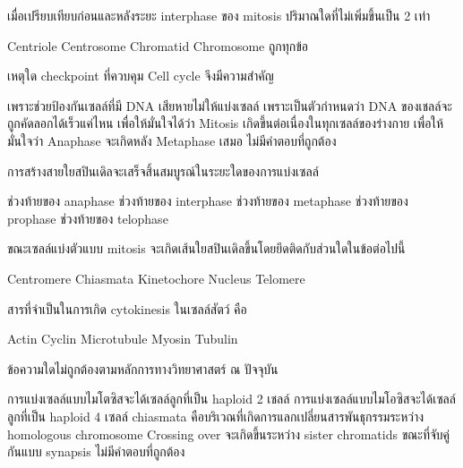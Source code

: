 \begin{questions}
\filbreak
  \question เมื่อเปรียบเทียบก่อนและหลังระยะ interphase ของ mitosis ปริมาณใดที่ไม่เพิ่มขึ้นเป็น 2 เท่า
  \begin{choices}
    \choice Centriole
    \choice Centrosome
    \choice Chromatid
    \choice Chromosome
    \choice ถูกทุกข้อ
\end{choices}

\filbreak
  \question เหตุใด checkpoint ที่ควบคุม Cell cycle จึงมีความสำคัญ
  \begin{choices}
    \choice เพราะช่วยป้องกันเซลล์ที่มี DNA เสียหายไม่ให้แบ่งเซลล์
    \choice เพราะเป็นตัวกำหนดว่า DNA ของเชลล์จะถูกคัดลอกได้เร็วแค่ไหน
    \choice เพื่อให้มั่นใจได้ว่า Mitosis เกิดขึ้นต่อเนื่องในทุกเซลล์ของร่างกาย
    \choice เพื่อให้มั่นใจว่า Anaphase จะเกิดหลัง Metaphase เสมอ
    \choice ไม่มีคำตอบที่ถูกต้อง
\end{choices}

\filbreak
  \question การสร้างสายใยสปินเดิลจะเสร็จสิ้นสมบูรณ์ในระยะใดของการแบ่งเซลล์
  \begin{choices}
    \choice ช่วงท้ายของ anaphase
    \choice ช่วงท้ายของ interphase
    \choice ช่วงท้ายของ metaphase
    \choice ช่วงท้ายของ prophase
    \choice ช่วงท้ายของ telophase
\end{choices}

\filbreak
  \question ขณะเซลล์แบ่งตัวแบบ mitosis จะเกิดเส้นใยสปินเดิลขึ้นโดยยึดติดกับส่วนใดในข้อต่อไปนี้
  \begin{choices}
    \choice Centromere
    \choice Chiasmata
    \choice Kinetochore
    \choice Nucleus
    \choice Telomere
\end{choices}

\filbreak
  \question สารที่จำเป็นในการเกิด cytokinesis ในเซลล์สัตว์ คือ
  \begin{choices}
    \choice Actin
    \choice Cyclin
    \choice Microtubule
    \choice Myosin
    \choice Tubulin
\end{choices}

\filbreak
  \question ข้อความใดไม่ถูกต้องตามหลักการทางวิทยาศาสตร์ ณ ปัจจุบัน
  \begin{choices}
    \choice การแบ่งเซลล์แบบไมโตซิสจะได้เซลล์ลูกที่เป็น haploid 2 เชลล์
    \choice การแบ่งเซลล์แบบไมโอซิสจะได้เซลล์ลูกที่เป็น haploid 4 เซลล์
    \choice chiasmata คือบริเวณที่เกิดการแลกเปลี่ยนสารพันธุกรรมระหว่าง homologous chromosome
    \choice Crossing over จะเกิดขึ้นระหว่าง sister chromatids ขณะที่จับคู่กันแบบ synapsis
    \choice ไม่มีคำตอบที่ถูกต้อง
\end{choices}


\end{questions}
